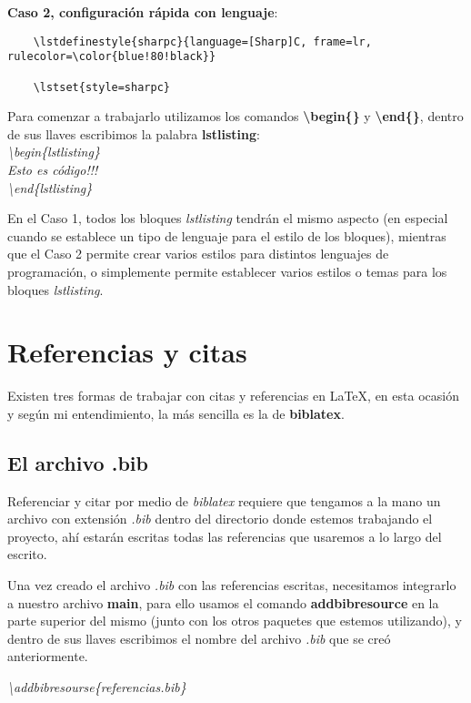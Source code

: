 \textbf{Caso 2, configuración rápida con lenguaje}:
\begin{lstlisting}
    \lstdefinestyle{sharpc}{language=[Sharp]C, frame=lr, rulecolor=\color{blue!80!black}}
    
    \lstset{style=sharpc}
\end{lstlisting}

Para comenzar a trabajarlo utilizamos los comandos \textbf{\textbackslash{begin\{\}}} y \textbf{\textbackslash{end\{\}}}, dentro de sus llaves escribimos la palabra \textbf{lstlisting}: \\
\textit{
    \textbackslash{begin}\{lstlisting\} \\
    Esto es código!!! \\
    \textbackslash{end}\{lstlisting\}
}

En el Caso 1, todos los bloques \textit{lstlisting} tendrán el mismo aspecto (en especial cuando se establece un tipo de lenguaje para el estilo de los bloques), mientras que el Caso 2 permite crear varios estilos para distintos lenguajes de programación, o simplemente permite establecer varios estilos o temas para los bloques \textit{lstlisting}.



\section{Referencias y citas}

Existen tres formas de trabajar con citas y referencias en \LaTeX, en esta ocasión y según mi entendimiento, la más sencilla es la de \textbf{biblatex}.


\subsection{El archivo .bib}

Referenciar y citar por medio de \textit{biblatex} requiere que tengamos a la mano un archivo con extensión \textit{.bib} dentro del directorio donde estemos trabajando el proyecto, ahí estarán escritas todas las referencias que usaremos a lo largo del escrito.

Una vez creado el archivo \textit{.bib} con las referencias escritas, necesitamos integrarlo a nuestro archivo \textbf{main}, para ello usamos el comando \textbf{addbibresource} en la parte superior del mismo (junto con los otros paquetes que estemos utilizando), y dentro de sus llaves escribimos el nombre del archivo \textit{.bib} que se creó anteriormente.
\begin{center}
    \textit{\textbackslash{addbibresourse\{referencias.bib\}}}
\end{center}

